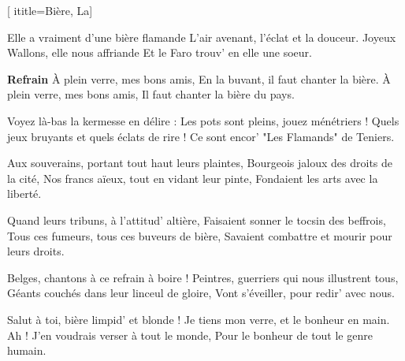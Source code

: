 [
  ititle={Bière, La}]

  
\beginverse
Elle a vraiment d'une bière flamande
L'air avenant, l'éclat et la douceur.
Joyeux Wallons, elle nous affriande
Et le Faro trouv' en elle une soeur.
\endverse

\beginchorus
\textbf{Refrain}
À plein verre, mes bons amis,
En la buvant, il faut chanter la bière.
À plein verre, mes bons amis,
Il faut chanter la bière du pays.
\endchorus

\beginverse
Voyez là-bas la kermesse en délire :
Les pots sont pleins, jouez ménétriers !
Quels jeux bruyants et quels éclats de rire !
Ce sont encor' "Les Flamands" de Teniers.
\endverse

\beginverse
Aux souverains, portant tout haut leurs plaintes,
Bourgeois jaloux des droits de la cité,
Nos francs aïeux, tout en vidant leur pinte,
Fondaient les arts avec la liberté.
\endverse

\beginverse
Quand leurs tribuns, à l'attitud' altière,
Faisaient sonner le tocsin des beffrois,
Tous ces fumeurs, tous ces buveurs de bière,
Savaient combattre et mourir pour leurs droits.
\endverse

\beginverse
Belges, chantons à ce refrain à boire !
Peintres, guerriers qui nous illustrent tous,
Géants couchés dans leur linceul de gloire,
Vont s'éveiller, pour redir' avec nous.
\endverse

\beginverse
Salut à toi, bière limpid' et blonde !
Je tiens mon verre, et le bonheur en main.
Ah ! J'en voudrais verser à tout le monde,
Pour le bonheur de tout le genre humain.
\endverse

\endsong
